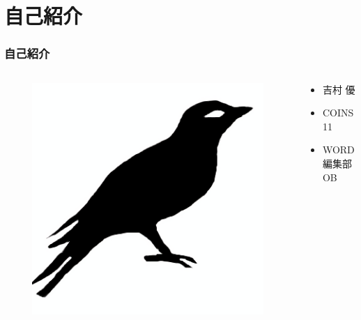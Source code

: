


\frame{\maketitle}

\section{自己紹介}
\begin{frame}[fragile]
  \frametitle{自己紹介}
  
  \begin{columns}
    \begin{column}{0.25\textwidth}
      \centering
      \begin{figure}
        \includegraphics[width=\textwidth]{img/bird2x.png}
      \end{figure}
    \end{column}
    \begin{column}{0.75\textwidth}
      \begin{itemize}
        \item<2-> 吉村 優
        \item<3-> COINS11
        \item<4-> WORD編集部OB
      \end{itemize}
    \end{column}
  \end{columns}
\end{frame}


